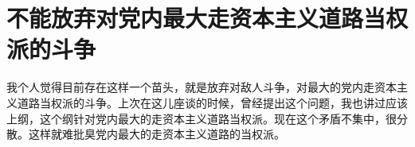 \section[不能放弃对党内最大走资本主义道路当权派的斗争（一九六七年四月）]{不能放弃对党内最大走资本主义道路当权派的斗争}


我个人觉得目前存在这样一个苗头，就是放弃对敌人斗争，对最大的党内走资本主义道路当权派的斗争。上次在这儿座谈的时候，曾经提出这个问题，我也讲过应该上纲，这个纲针对党内最大的走资本主义道路当权派。现在这个矛盾不集中，很分散。这样就难批臭党内最大的走资本主义道路的当权派。

